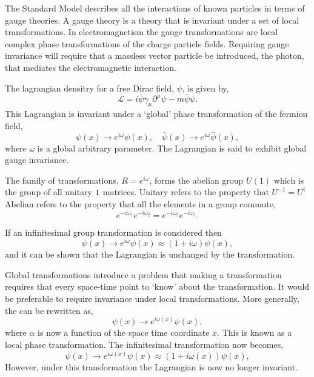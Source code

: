 The {Standard Model} describes all the interactions of known particles in terms of gauge
theories. A gauge theory is a theory that is invariant under a set of local
transformations.  In electromagnetism the gauge transformations are local
complex phase transformations of the charge particle fields. Requiring gauge
invariance will require that a massless vector particle be introduced,
the photon, that mediates the electromagnetic interaction.

The lagrangian densitry for a free Dirac field, $\psi$, is given by,
\begin{equation}
\mathcal{L} = i \bar{\psi} \gamma_{\mu} \partial^{\mu} \psi - m \bar{\psi}\psi .
\end{equation}
This Lagrangian is invariant under a `global' phase transformation of the
fermion field,
\begin{equation}
\psi(x) \to e^{i\omega} \psi(x), \quad \bar{\psi}(x) \to e^{i\omega}\bar{\psi}(x),
\label{eq:global}
\end{equation}
where $\omega$ is a global arbitrary parameter. 
The Lagrangian is said to exhibit global gauge invariance. 

The family of transformations, $R = e^{i \omega}$, forms the
abelian group $U(1)$ which is the group of all unitary $1\time1$ matrices.
Unitary refers to the property that $U^{-1} = {U}^{\dagger}$
Abelian refers to the property that all the elements in a
group commute, 
\begin{equation}
e^{-i\omega_1} 
e^{-i\omega_2} 
=
e^{-i\omega_2} 
e^{-i\omega_1} .
\end{equation}

If an infinitesimal group transformation is considered then 
\begin{equation}
\psi(x) 
\to e^{i\omega} \psi(x)
\approx (1+i\omega)\psi(x),
\end{equation}
and it can be shown that the Lagrangian is unchanged by the
transformation\cite{halzen1984quarks}.

Global transformations introduce a problem that making a transformation requires
that every space-time point to `know' about the transformation. It would be
preferable to require invariance under local transformations.
More generally, the  can be rewritten as,
\begin{equation}
\psi(x) \to e^{i\omega(x)} \psi(x),
\label{eq:local}
\end{equation}
where $\alpha$ is now a function of the space time coordinate $x$. This is known
as a local phase transformation. The infinitesimal transformation now becomes,
\begin{equation}
\psi(x) 
\to e^{i\omega(x)} \psi(x)
\approx (1+i\omega(x))\psi(x),
\end{equation}
However, under this transformation the Lagrangian is now no longer invariant. 

